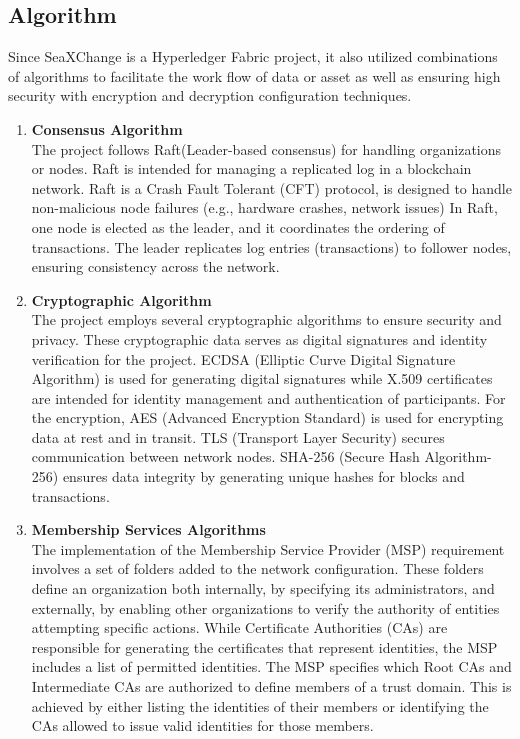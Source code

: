 \subsection{Algorithm}
Since SeaXChange is a Hyperledger Fabric project, it also utilized combinations of algorithms to facilitate the work flow of data or asset as well as ensuring high security with encryption and decryption configuration techniques. 
	\begin{enumerate}
		\item \textbf{Consensus Algorithm} \\The project follows Raft(Leader-based consensus) for handling organizations or nodes. Raft is intended for managing a replicated log in a blockchain network. Raft is a Crash Fault Tolerant (CFT) protocol, is designed to handle non-malicious node failures (e.g., hardware crashes, network issues) In Raft, one node is elected as the leader, and it coordinates the ordering of transactions. The leader replicates log entries (transactions) to follower nodes, ensuring consistency across the network. 
		
		\item \textbf{Cryptographic Algorithm} \\The project employs several cryptographic algorithms to ensure security and privacy. These cryptographic data serves as digital signatures and identity verification for the project. ECDSA (Elliptic Curve Digital Signature Algorithm) is used for generating digital signatures while X.509 certificates are intended for identity management and authentication of participants. For the encryption, AES (Advanced Encryption Standard) is used for encrypting data at rest and in transit. TLS (Transport Layer Security) secures communication between network nodes. SHA-256 (Secure Hash Algorithm-256) ensures data integrity by generating unique hashes for blocks and transactions.
		
		\item \textbf{Membership Services Algorithms} \\The implementation of the Membership Service Provider (MSP) requirement involves a set of folders added to the network configuration. These folders define an organization both internally, by specifying its administrators, and externally, by enabling other organizations to verify the authority of entities attempting specific actions. While Certificate Authorities (CAs) are responsible for generating the certificates that represent identities, the MSP includes a list of permitted identities. The MSP specifies which Root CAs and Intermediate CAs are authorized to define members of a trust domain. This is achieved by either listing the identities of their members or identifying the CAs allowed to issue valid identities for those members.
		

\end{enumerate}
